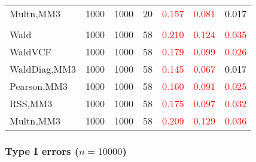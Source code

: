 \documentclass[
]{article}
\begin{document}
\begin{table}[H]
{\begin{tabular}[t]{lrrrrrr}
\hspace{1em}Multn,MM3 & 1000 & 1000 & 20 & \textcolor{red}{0.157} & \textcolor{red}{0.081} & \textcolor{black}{0.017}\\
\addlinespace[0.3em]
\multicolumn{7}{l}{\textbf{3F 15V}}\\
\hspace{1em}Wald & 1000 & 1000 & 58 & \textcolor{red}{0.210} & \textcolor{red}{0.124} & \textcolor{red}{0.035}\\
\hspace{1em}WaldVCF & 1000 & 1000 & 58 & \textcolor{red}{0.179} & \textcolor{red}{0.099} & \textcolor{red}{0.026}\\
\hspace{1em}WaldDiag,MM3 & 1000 & 1000 & 58 & \textcolor{red}{0.145} & \textcolor{red}{0.067} & \textcolor{black}{0.017}\\
\hspace{1em}Pearson,MM3 & 1000 & 1000 & 58 & \textcolor{red}{0.160} & \textcolor{red}{0.091} & \textcolor{red}{0.025}\\
\hspace{1em}RSS,MM3 & 1000 & 1000 & 58 & \textcolor{red}{0.175} & \textcolor{red}{0.097} & \textcolor{red}{0.032}\\
\hspace{1em}Multn,MM3 & 1000 & 1000 & 58 & \textcolor{red}{0.209} & \textcolor{red}{0.129} & \textcolor{red}{0.036}\\
\bottomrule
\end{tabular}}
\endgroup{}
\end{table}

\hypertarget{type-i-errors-n10000-3}{%
\subsubsection{\texorpdfstring{Type I errors
(\(n=10000\))}{Type I errors (n=10000)}}\label{type-i-errors-n10000-3}}
\end{document}
